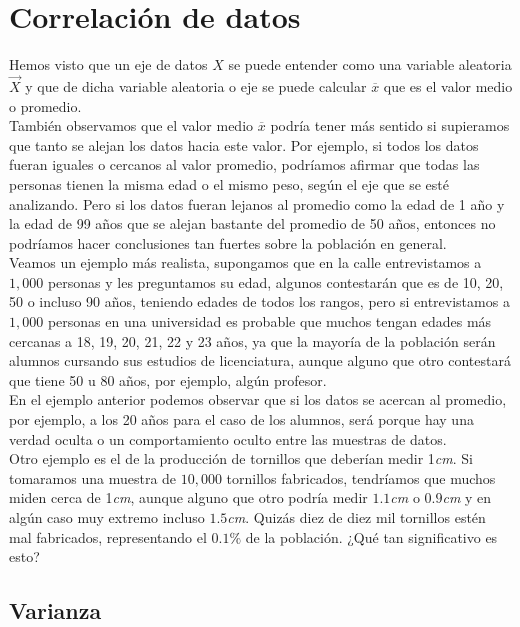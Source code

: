 \documentclass{article}
\begin{document}
\section{Correlación de datos}

Hemos visto que un eje de datos $X$ se puede entender como una variable aleatoria $\vec{X}$ y que de dicha variable aleatoria o eje se puede calcular $\overline{x}$ que es el valor medio o promedio.
\\[12pt]
También observamos que el valor medio $\overline{x}$ podría tener más sentido si supieramos que tanto se alejan los datos hacia este valor. Por ejemplo, si todos los datos fueran iguales o cercanos al valor promedio, podríamos afirmar que todas las personas tienen la misma edad o el mismo peso, según el eje que se esté analizando. Pero si los datos fueran lejanos al promedio como la edad de 1 año y la edad de 99 años que se alejan bastante del promedio de 50 años, entonces no podríamos hacer conclusiones tan fuertes sobre la población en general.
\\[12pt]
Veamos un ejemplo más realista, supongamos que en la calle entrevistamos a $1,000$ personas y les preguntamos su edad, algunos contestarán que es de 10, 20, 50 o incluso 90 años, teniendo edades de todos los rangos, pero si entrevistamos a $1,000$ personas en una universidad es probable que muchos tengan edades más cercanas a 18, 19, 20, 21, 22 y 23 años, ya que la mayoría de la población serán alumnos cursando sus estudios de licenciatura, aunque alguno que otro contestará que tiene 50 u 80 años, por ejemplo, algún profesor.
\\[12pt]
En el ejemplo anterior podemos observar que si los datos se acercan al promedio, por ejemplo, a los 20 años para el caso de los alumnos, será porque hay una verdad oculta o un comportamiento oculto entre las muestras de datos.
\\[12pt]
Otro ejemplo es el de la producción de tornillos que deberían medir 1\textit{cm}. Si tomaramos una muestra de $10,000$ tornillos fabricados, tendríamos que muchos miden cerca de 1\textit{cm}, aunque alguno que otro podría medir $1.1$\textit{cm} o $0.9$\textit{cm} y en algún caso muy extremo incluso $1.5$\textit{cm}. Quizás diez de diez mil tornillos estén mal fabricados, representando el $0.1\%$ de la población. ¿Qué tan significativo es esto?

\subsection{Varianza}
\end{document}
